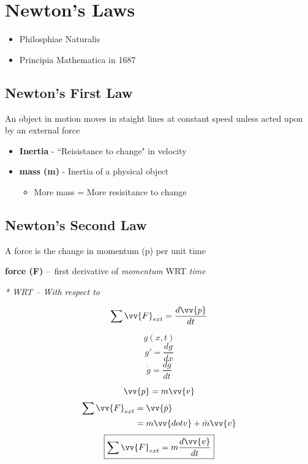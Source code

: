 \documentclass{article}
\begin{document}
\newpage
    \tableofcontents
\newpage

\section{Newton's Laws}

\begin{itemize}
    \item Philosphiae Naturalis
    \item Principia Mathematica in 1687
\end{itemize}

\subsection{Newton's First Law}

An object in motion moves in staight lines at constant speed unless acted upon by an external force

\begin{itemize}
    \item \textbf{Inertia} - ``Reisistance to change" in velocity
    \item \textbf{mass (m)} - Inertia of a physical object
        \begin{itemize}
            \item More mass = More resisitance to change
        \end{itemize}
\end{itemize}

\subsection{Newton's Second Law}

A force is the change in momentum (p) per unit time

\textbf{force (F)} – first derivative of \textit{momentum} WRT \textit{time}

\textit{* WRT – With respect to}

$$ \sum \vv{F}_{ext} = \frac{ d\vv{p} }{dt} $$

$$ g(x,t) $$
$$ g' = \frac{dg}{dx} $$
$$ \dot{g} = \frac{dg}{dt} $$

$$ \vv{p} = m\vv{v} $$
\begin{align*}
    \sum \vv{F}_{ext} & = \vv{\dot{p}} \\
                      & = m\vv{dot{v}} + \dot{m}\vv{v}
\end{align*}
\begin{equation*}
    \boxed{\sum \vv{F}_{ext} = m\frac{d\vv{v}}{dt}}
\end{equation*}
\end{document}
